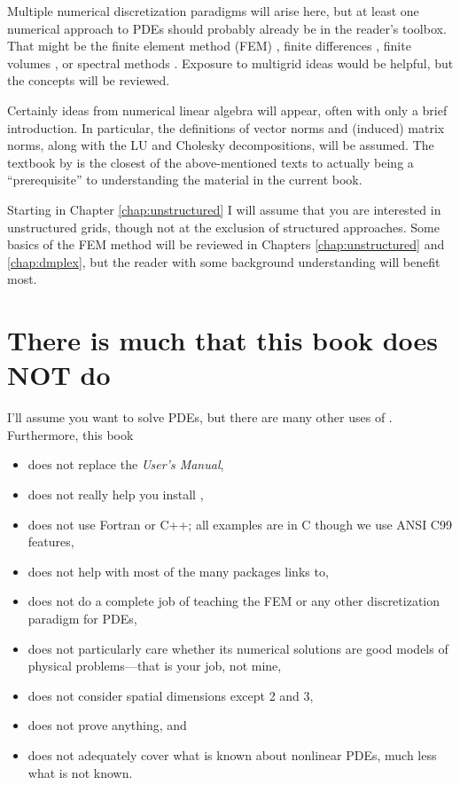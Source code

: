 Multiple numerical discretization paradigms will arise here, but at least one numerical approach to PDEs should probably already be in the reader's toolbox.  That might be the finite element method (FEM) \citep{Braess,Elmanetal2005}, finite differences \citep{MortonMayers}, finite volumes \citep{LeVeque}, or spectral methods \citep{KarniadakisSherwin,Trefethen}.  Exposure to multigrid ideas \citep{Briggsetal2000} would be helpful, but the concepts will be reviewed.

Certainly ideas from numerical linear algebra \citep{Greenbaum1997,TrefethenBau} will appear, often with only a brief introduction.  In particular, the definitions of vector norms and (induced) matrix norms, along with the LU and Cholesky decompositions, will be assumed.  The textbook by \citet{TrefethenBau} is the closest of the above-mentioned texts to actually being a ``prerequisite'' to understanding the material in the current book.

Starting in Chapter \ref{chap:unstructured} I will assume that you are interested in unstructured grids, though not at the exclusion of structured approaches.  Some basics of the FEM method will be reviewed in Chapters \ref{chap:unstructured} and \ref{chap:dmplex}, but the reader with some background understanding will benefit most.


\section{There is much that this book does NOT do}

I'll assume you want to solve PDEs, but there are many other uses of \PETSc.  Furthermore, this book\begin{itemize}
\item  does not replace the \PETSc \emph{User's Manual},
\item  does not really help you install \PETSc,
\item  does not use Fortran or C++; all examples are in C though we use ANSI C99 features,
\item  does not help with most of the many packages \PETSc links to,
\item  does not do a complete job of teaching the FEM or any other discretization paradigm for PDEs,
\item  does not particularly care whether its numerical solutions are good models of physical problems---that is your job, not mine,
\item  does not consider spatial dimensions except 2 and 3,
\item  does not prove anything, and
\item  does not adequately cover what is known about nonlinear PDEs, much less what is not known.
\end{itemize}


